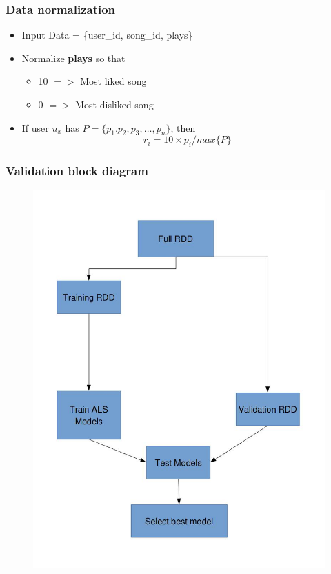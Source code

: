 \documentclass[11pt]{beamer}
\begin{document}
\begin{frame}
  \frametitle{Data normalization}
  \begin{itemize}
    \item Input Data = \{user\_id, song\_id, plays\}
    \item Normalize {\bf plays} so that
      \begin{itemize}
        \item 10 $=>$ Most liked song
        \item 0 $=>$ Most disliked song
      \end{itemize}
    \item If user $u_x$ has $P = \{p_1. p_2, p_3,\dots,p_n	\}$, then
      \begin{equation}
        r_i = 10 \times p_i/max\{P\}
      \end{equation}
  \end{itemize}
\end{frame}

\begin{frame}
  \frametitle{Validation block diagram}
  \begin{figure}
    \includegraphics[width=0.5\linewidth]{figures/Validation.jpg}
  \end{figure}
\end{frame}
\end{document}
